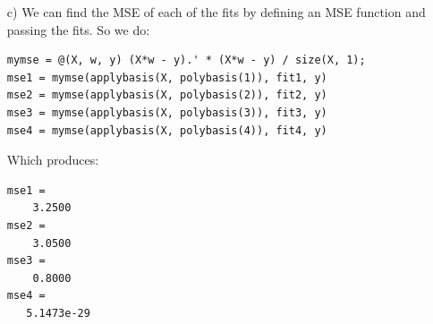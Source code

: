 \documentclass[11pt]{article}
\begin{document}
\begin{itemize}
    \item[c)] We can find the MSE of each of the fits by defining an MSE function and passing the fits. So we do:
        \begin{lstlisting}
mymse = @(X, w, y) (X*w - y).' * (X*w - y) / size(X, 1);
mse1 = mymse(applybasis(X, polybasis(1)), fit1, y)
mse2 = mymse(applybasis(X, polybasis(2)), fit2, y)
mse3 = mymse(applybasis(X, polybasis(3)), fit3, y)
mse4 = mymse(applybasis(X, polybasis(4)), fit4, y)\end{lstlisting}
        Which produces:
        \begin{lstlisting}
mse1 =
    3.2500
mse2 =
    3.0500
mse3 =
    0.8000
mse4 =
   5.1473e-29\end{lstlisting}       
        
\end{itemize}
\end{document}
